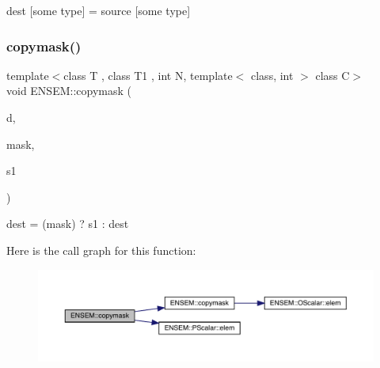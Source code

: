 dest \mbox{[}some type\mbox{]} = source \mbox{[}some type\mbox{]} 

\mbox{\label{group__primvector_ga6018d56f682cba0fc157b7df0ac3b403}} 
\subsubsection{\texorpdfstring{copymask()}{copymask()}}
{\footnotesize\ttfamily template$<$class T , class T1 , int N, template$<$ class, int $>$ class C$>$ \\
void E\+N\+S\+E\+M\+::copymask (\begin{DoxyParamCaption}\item[{\mbox{\hyperlink{classENSEM_1_1PVector}{P\+Vector}}$<$ T, \mbox{\hyperlink{operator__name__util_8cc_a7722c8ecbb62d99aee7ce68b1752f337}{N}}, C $>$ \&}]{d,  }\item[{const \mbox{\hyperlink{classENSEM_1_1PScalar}{P\+Scalar}}$<$ T1 $>$ \&}]{mask,  }\item[{const \mbox{\hyperlink{classENSEM_1_1PVector}{P\+Vector}}$<$ T, \mbox{\hyperlink{operator__name__util_8cc_a7722c8ecbb62d99aee7ce68b1752f337}{N}}, C $>$ \&}]{s1 }\end{DoxyParamCaption})\hspace{0.3cm}{\ttfamily [inline]}}



dest = (mask) ? s1 \+: dest 

Here is the call graph for this function\+:\nopagebreak
\begin{figure}[H]
\begin{center}
\leavevmode
\includegraphics[width=350pt]{d3/dc4/group__primvector_ga6018d56f682cba0fc157b7df0ac3b403_cgraph}
\end{center}
\end{figure}
\mbox{\label{group__primvector_ga54096af2b60c9427d37bd363286b820f}} 
